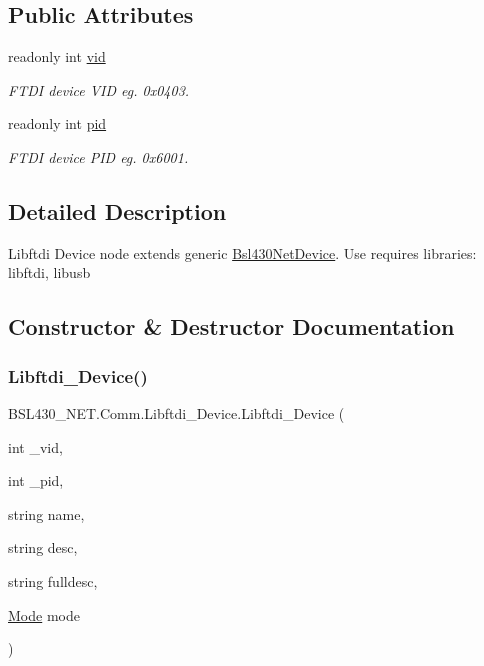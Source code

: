 \subsection*{Public Attributes}
\begin{DoxyCompactItemize}
\item 
readonly int \mbox{\hyperlink{class_b_s_l430___n_e_t_1_1_comm_1_1_libftdi___device_ac786cebd3d76766f0c1f212df6d8bdaa}{vid}}
\begin{DoxyCompactList}\small\item\em F\+T\+DI device V\+ID eg. 0x0403. \end{DoxyCompactList}\item 
readonly int \mbox{\hyperlink{class_b_s_l430___n_e_t_1_1_comm_1_1_libftdi___device_ae7dcdc3716d2cbe2328bd108307e9d2f}{pid}}
\begin{DoxyCompactList}\small\item\em F\+T\+DI device P\+ID eg. 0x6001. \end{DoxyCompactList}\end{DoxyCompactItemize}


\subsection{Detailed Description}
Libftdi Device node extends generic \mbox{\hyperlink{class_b_s_l430___n_e_t_1_1_bsl430_net_device}{Bsl430\+Net\+Device}}. Use requires libraries\+: libftdi, libusb 



\subsection{Constructor \& Destructor Documentation}
\mbox{\label{class_b_s_l430___n_e_t_1_1_comm_1_1_libftdi___device_a8ea266a0b14a05f22bef5f817b6f5c45}} 
\subsubsection{\texorpdfstring{Libftdi\_Device()}{Libftdi\_Device()}}
{\footnotesize\ttfamily B\+S\+L430\+\_\+\+N\+E\+T.\+Comm.\+Libftdi\+\_\+\+Device.\+Libftdi\+\_\+\+Device (\begin{DoxyParamCaption}\item[{int}]{\+\_\+vid,  }\item[{int}]{\+\_\+pid,  }\item[{string}]{name,  }\item[{string}]{desc,  }\item[{string}]{fulldesc,  }\item[{\mbox{\hyperlink{namespace_b_s_l430___n_e_t_aa1c6981cb6f279b5491d861ca555a1d7}{Mode}}}]{mode }\end{DoxyParamCaption})}



